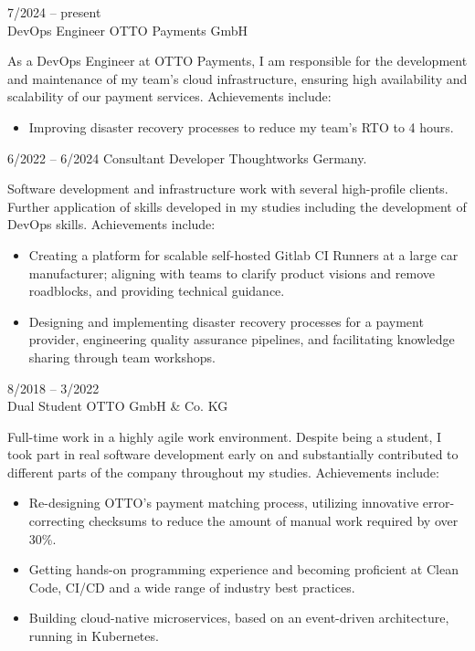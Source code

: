 \documentclass[9pt]{developercv} %
\begin{document}
    \begin{entrylist}
        \entry
        {7/2024 -- present\\}
        {DevOps Engineer}
        {OTTO Payments GmbH}
        {As a DevOps Engineer at OTTO Payments, I am responsible for the development and maintenance of my team's
        cloud infrastructure, ensuring high availability and scalability of our payment services. Achievements include:
            \begin{itemize}
                \item Improving disaster recovery processes to reduce my team's RTO to 4 hours.
            \end{itemize}
        }

        \entry
        {6/2022 -- 6/2024}
        {Consultant Developer}
        {Thoughtworks Germany.}
        {Software development and infrastructure work with several high-profile clients.
        Further application of skills developed in my studies including the development of DevOps skills.
        Achievements include:

            \begin{itemize}
                \item Creating a platform for scalable self-hosted Gitlab CI Runners at a large car manufacturer;
                aligning with teams to clarify product visions and remove roadblocks, and providing technical guidance.
                \item Designing and implementing disaster recovery processes for a payment provider, engineering quality
                assurance pipelines, and facilitating knowledge sharing through team workshops.
            \end{itemize}
        }

        \entry
        {8/2018 -- 3/2022\\}
        {Dual Student}
        {OTTO GmbH \& Co. KG}
        {Full-time work in a highly agile work environment. Despite being a student, I took part in real software
        development early on and substantially contributed to different parts of the company throughout my studies.
        Achievements include:

            \begin{itemize}
                \item Re-designing OTTO's payment matching process, utilizing innovative error-correcting checksums to
                reduce the amount of manual work required by over 30\%.
                \item Getting hands-on programming experience and becoming proficient at Clean Code, CI/CD and a
                wide range of industry best practices.
                \item Building cloud-native microservices, based on an event-driven architecture, running in Kubernetes.
            \end{itemize}
        }
    \end{entrylist}
\end{document}
